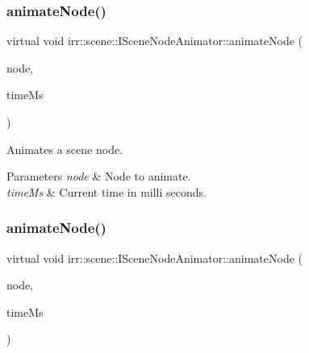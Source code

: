 \subsubsection{\texorpdfstring{animate\+Node()}{animateNode()}\hspace{0.1cm}{\footnotesize\ttfamily [1/2]}}
{\footnotesize\ttfamily virtual void irr\+::scene\+::\+I\+Scene\+Node\+Animator\+::animate\+Node (\begin{DoxyParamCaption}\item[{\hyperlink{classirr_1_1scene_1_1ISceneNode}{I\+Scene\+Node} $\ast$}]{node,  }\item[{\hyperlink{namespaceirr_a0416a53257075833e7002efd0a18e804}{u32}}]{time\+Ms }\end{DoxyParamCaption})\hspace{0.3cm}{\ttfamily [pure virtual]}}



Animates a scene node. 


\begin{DoxyParams}{Parameters}
{\em node} & Node to animate. \\
\hline
{\em time\+Ms} & Current time in milli seconds. \\
\hline
\end{DoxyParams}
\mbox{\label{classirr_1_1scene_1_1ISceneNodeAnimator_ab2170d133db16de148d0f6841c06bc84}} 
\subsubsection{\texorpdfstring{animate\+Node()}{animateNode()}\hspace{0.1cm}{\footnotesize\ttfamily [2/2]}}
{\footnotesize\ttfamily virtual void irr\+::scene\+::\+I\+Scene\+Node\+Animator\+::animate\+Node (\begin{DoxyParamCaption}\item[{\hyperlink{classirr_1_1scene_1_1ISceneNode}{I\+Scene\+Node} $\ast$}]{node,  }\item[{\hyperlink{namespaceirr_a0416a53257075833e7002efd0a18e804}{u32}}]{time\+Ms }\end{DoxyParamCaption})\hspace{0.3cm}{\ttfamily [pure virtual]}}



